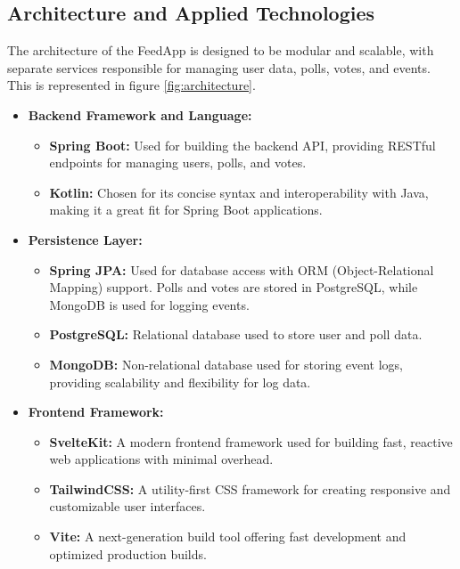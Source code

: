 \subsection{Architecture and Applied Technologies}
The architecture of the FeedApp is designed to be modular and scalable, with separate services responsible for managing user data, polls, votes, and events. This is represented in figure \ref{fig:architecture}. 
\begin{itemize}
    \item \textbf{Backend Framework and Language:} 
    \begin{itemize}
        \item \textbf{Spring Boot:} Used for building the backend API, providing RESTful endpoints for managing users, polls, and votes. \cite{spring_boot}
        \item \textbf{Kotlin:} Chosen for its concise syntax and interoperability with Java, making it a great fit for Spring Boot applications.\cite{kotlin}
    \end{itemize}
    
    \item \textbf{Persistence Layer:} 
    \begin{itemize}
        \item \textbf{Spring JPA:} Used for database access with ORM (Object-Relational Mapping) support. Polls and votes are stored in PostgreSQL, while MongoDB is used for logging events. \cite{spring_jpa}
        \item \textbf{PostgreSQL:} Relational database used to store user and poll data. \cite{postgresql}
        \item \textbf{MongoDB:} Non-relational database used for storing event logs, providing scalability and flexibility for log data. \cite{mongodb}
    \end{itemize}
    
    \item \textbf{Frontend Framework:} 
    \begin{itemize}
        \item \textbf{SvelteKit:} A modern frontend framework used for building fast, reactive web applications with minimal overhead. \cite{sveltekit}
        \item \textbf{TailwindCSS:} A utility-first CSS framework for creating responsive and customizable user interfaces. \cite{tailwindcss}
        \item \textbf{Vite:} A next-generation build tool offering fast development and optimized production builds. \cite{vite}
    \end{itemize}
    

\end{itemize}
